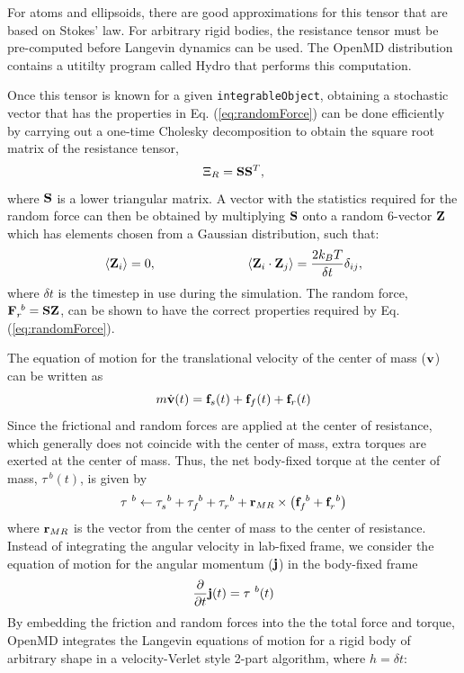 \documentclass[letterpaper]{report}
\begin{document}
For atoms and ellipsoids, there are good approximations for this
tensor that are based on Stokes' law.  For arbitrary rigid bodies, the
resistance tensor must be pre-computed before Langevin dynamics can be
used.  The OpenMD distribution contains a utitilty program called
Hydro that performs this computation.

Once this tensor is known for a given {\tt integrableObject},
obtaining a stochastic vector that has the properties in
Eq. (\ref{eq:randomForce}) can be done efficiently by carrying out a
one-time Cholesky decomposition to obtain the square root matrix of
the resistance tensor,
\begin{equation} 
\Xi_R = {\bf S} {\bf S}^{T},
\label{eq:Cholesky}
\end{equation} 
where ${\bf S}$ is a lower triangular matrix.\cite{Schlick2002} A
vector with the statistics required for the random force can then be
obtained by multiplying ${\bf S}$ onto a random 6-vector ${\bf Z}$ which
has elements chosen from a Gaussian distribution, such that:
\begin{equation}
\langle {\bf Z}_i \rangle = 0, \hspace{1in} \langle {\bf Z}_i \cdot
{\bf Z}_j \rangle = \frac{2 k_B T}{\delta t} \delta_{ij},
\end{equation}
where $\delta t$ is the timestep in use during the simulation. The
random force, ${\bf F}_{r}^{~b} = {\bf S} {\bf Z}$, can be shown to have the
correct properties required by Eq. (\ref{eq:randomForce}).

The equation of motion for the translational velocity of the center of
mass (${\bf v}$) can be written as
\begin{equation}
m \dot{{\bf v}} (t) =  {\bf f}_{s}(t) + {\bf f}_{f}(t) +
{\bf f}_{r}(t)
\end{equation}
Since the frictional and random forces are applied at the center of
resistance, which generally does not coincide with the center of mass,
extra torques are exerted at the center of mass. Thus, the net
body-fixed torque at the center of mass, $\tau^{~b}(t)$,
is given by
\begin{equation}
\tau^{~b} \leftarrow \tau_{s}^{~b} + \tau_{f}^{~b} + \tau_{r}^{~b} + {\bf r}_{MR} \times \left( {\bf f}_{f}^{~b} + {\bf f}_{r}^{~b} \right)
\end{equation}
where ${\bf r}_{MR}$ is the vector from the center of mass to the center of
resistance. Instead of integrating the angular velocity in lab-fixed
frame, we consider the equation of motion for the angular momentum
(${\bf j}$) in the body-fixed frame
\begin{equation}
\frac{\partial}{\partial t}{\bf j}(t) = \tau^{~b}(t)
\end{equation}
By embedding the friction and random forces into the the total force
and torque, OpenMD integrates the Langevin equations of motion
for a rigid body of arbitrary shape in a velocity-Verlet style 2-part
algorithm, where $h = \delta t$:
\end{document}
